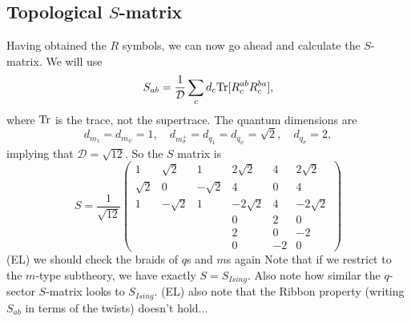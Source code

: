 \documentclass[12pt,a4paper]{article}
\newcommand{\mcd}{\mathcal{D}}
\newcommand\be            {\begin{equation}}
\newcommand\ee            {\end{equation}}
\newcommand{\ethan}[1]{{\color{amethyst}\footnotesize{(EL) #1}}}
\begin{document}
\subsection{Topological $S$-matrix}
Having obtained the $R$ symbols, we can now go ahead and calculate the $S$-matrix. We will use 
\be S_{ab} = \frac{1}{\mcd}\sum_{c}d_c{\rm Tr}[R^{ab}_cR^{ba}_c],\ee
where ${\rm Tr}$ is the trace, not the supertrace. The quantum dimensions are 
\be d_{m_1} = d_{m_\psi} = 1,\quad d_{m_\sigma^+} = d_{q_1} = d_{q_\psi} = \sqrt{2},\quad d_{q_\sigma} = 2,\ee
implying that $\mcd = \sqrt{12}$. So the $S$ matrix is 
\be S = \frac{1}{\sqrt{12}} \begin{pmatrix} 
1&\sqrt{2}&1&2\sqrt{2}&4&2\sqrt{2} \\
 \sqrt{2}&0&-\sqrt{2}&4&0&4 \\ 
 1&-\sqrt{2}&1&-2\sqrt{2}&4&-2\sqrt{2} \\ 
 &&&0&2&0 \\ 
 &&&2&0&-2 \\ 
 &&&0 & -2 & 0 \end{pmatrix} \ee
\ethan{we should check the braids of $q$s and $m$s again}
Note that if we restrict to the $m$-type subtheory, we have exactly $S = S_{Ising}$. Also note how similar the $q$-sector $S$-matrix looks to $S_{Ising}$. 
\ethan{also note that the Ribbon property (writing $S_{ab}$ in terms of the twists) doesn't hold...}
\end{document}
